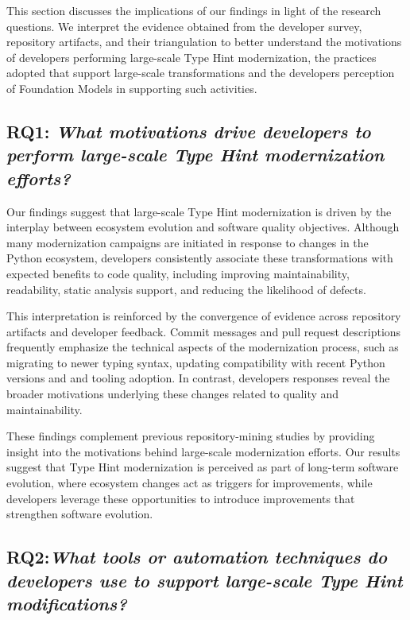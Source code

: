 This section discusses the implications of our findings in light of the research questions. We interpret the evidence obtained from the developer survey, repository artifacts, and their triangulation to better understand the motivations of developers performing large-scale Type Hint modernization, the practices adopted that support large-scale transformations and the developers perception of Foundation Models in supporting such activities.

\subsection{RQ1: \textit{What motivations drive developers to perform large-scale Type Hint modernization efforts?}}

Our findings suggest that large-scale Type Hint modernization is driven by the interplay between ecosystem evolution and software quality objectives. Although many modernization campaigns are initiated in response to changes in the Python ecosystem, developers consistently associate these transformations with expected benefits to code quality, including improving maintainability, readability, static analysis support, and reducing the likelihood of defects.

This interpretation is reinforced by the convergence of evidence across repository artifacts and developer feedback. Commit messages and pull request descriptions frequently emphasize the technical aspects of the modernization process, such as migrating to newer typing syntax, updating compatibility with recent Python versions and and tooling adoption. In contrast, developers responses reveal the broader motivations underlying these changes related to quality and maintainability.

These findings complement previous repository-mining studies by providing insight into the motivations behind large-scale modernization efforts. Our results suggest that Type Hint modernization is perceived as part of long-term software evolution, where ecosystem changes act as triggers for improvements, while developers leverage these opportunities to introduce improvements that strengthen software evolution.

\subsection{RQ2:\textit{What tools or automation techniques do developers use to support large-scale Type Hint modifications?}}

